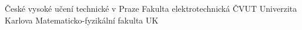 
  {České vysoké učení technické v Praze}
   {Fakulta elektrotechnická ČVUT}
    {Univerzita Karlova}
   {Matematicko-fyzikální fakulta UK}


